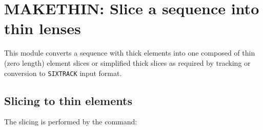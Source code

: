 
\chapter{MAKETHIN: Slice a sequence into thin lenses}
\label{chap:makethin}

This module converts a sequence with thick elements into one composed of
thin (zero length) element slices or simplified thick slices as required
by \madx tracking or conversion to \texttt{SIXTRACK} input format.

\section{Slicing to thin elements}

The slicing is performed by the command: 

